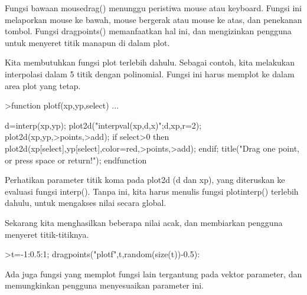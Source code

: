 \documentclass[12pt,arial,letterpaper]{book}
\begin{document}
\begin{eulercomment}
\begin{eulercomment}
\begin{eulercomment}
\begin{eulercomment}
\begin{eulercomment}
\begin{eulercomment}
\begin{eulercomment}
\begin{eulercomment}
\begin{eulercomment}
\begin{eulercomment}
\begin{eulercomment}
\begin{eulercomment}
\begin{eulercomment}
\begin{eulercomment}
\begin{eulercomment}
\begin{eulercomment}
\begin{eulercomment}
Fungsi bawaan mousedrag() menunggu peristiwa mouse atau keyboard.
Fungsi ini melaporkan mouse ke bawah, mouse bergerak atau mouse ke
atas, dan penekanan tombol. Fungsi dragpoints() memanfaatkan hal ini,
dan mengizinkan pengguna untuk menyeret titik manapun di dalam plot.

Kita membutuhkan fungsi plot terlebih dahulu. Sebagai contoh, kita
melakukan interpolasi dalam 5 titik dengan polinomial. Fungsi ini
harus memplot ke dalam area plot yang tetap.
\end{eulercomment}
\begin{eulerprompt}
>function plotf(xp,yp,select) ...
\end{eulerprompt}
\begin{eulerudf}
    d=interp(xp,yp);
    plot2d("interpval(xp,d,x)";d,xp,r=2);
    plot2d(xp,yp,>points,>add);
    if select>0 then
      plot2d(xp[select],yp[select],color=red,>points,>add);
    endif;
    title("Drag one point, or press space or return!");
  endfunction
\end{eulerudf}
\begin{eulercomment}
Perhatikan parameter titik koma pada plot2d (d dan xp), yang
diteruskan ke evaluasi fungsi interp(). Tanpa ini, kita harus menulis
fungsi plotinterp() terlebih dahulu, untuk mengakses nilai secara
global.

Sekarang kita menghasilkan beberapa nilai acak, dan membiarkan
pengguna menyeret titik-titiknya.
\end{eulercomment}
\begin{eulerprompt}
>t=-1:0.5:1; dragpoints("plotf",t,random(size(t))-0.5):
\end{eulerprompt}
\begin{eulercomment}
Ada juga fungsi yang memplot fungsi lain tergantung pada vektor
parameter, dan memungkinkan pengguna menyesuaikan parameter ini.


\end{eulercomment}
\end{eulercomment}
\end{eulercomment}
\end{eulercomment}
\end{eulercomment}
\end{eulercomment}
\end{eulercomment}
\end{eulercomment}
\end{eulercomment}
\end{eulercomment}
\end{eulercomment}
\end{eulercomment}
\end{eulercomment}
\end{eulercomment}
\end{eulercomment}
\end{eulercomment}
\end{eulercomment}
\end{document}
